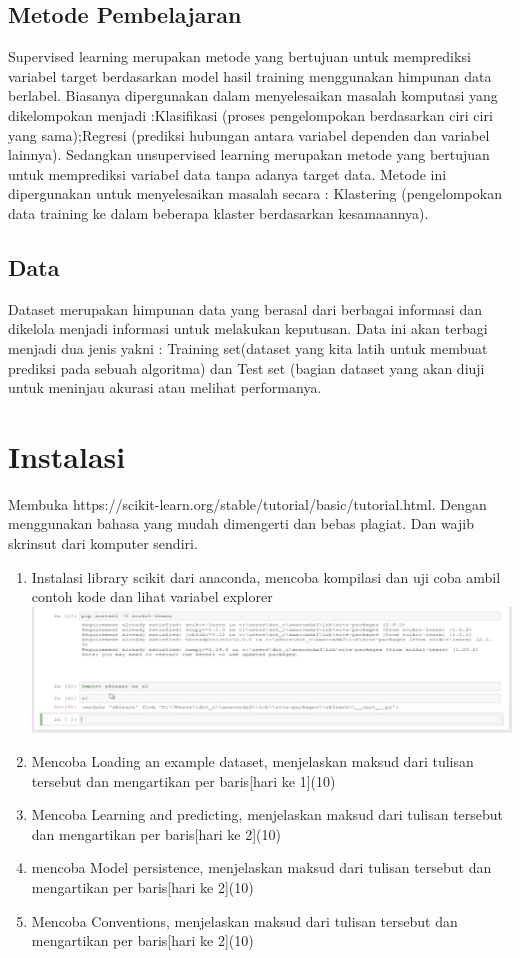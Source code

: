 \subsection{Metode Pembelajaran}
	Supervised learning merupakan metode yang bertujuan untuk memprediksi variabel target berdasarkan model hasil training menggunakan himpunan data berlabel. Biasanya dipergunakan dalam menyelesaikan masalah komputasi yang dikelompokan menjadi :Klasifikasi (proses pengelompokan berdasarkan ciri ciri yang sama);Regresi (prediksi hubungan antara variabel dependen dan variabel lainnya). Sedangkan unsupervised learning merupakan metode yang bertujuan untuk memprediksi variabel data tanpa adanya target data. Metode ini dipergunakan untuk menyelesaikan masalah secara : Klastering (pengelompokan data training ke dalam beberapa klaster berdasarkan kesamaannya).
\subsection{Data}
Dataset merupakan himpunan data yang berasal dari berbagai informasi dan dikelola menjadi informasi  untuk melakukan keputusan. Data ini akan terbagi menjadi dua jenis yakni : Training set(dataset yang kita latih untuk membuat prediksi pada sebuah algoritma) dan Test set (bagian dataset yang akan diuji untuk meninjau akurasi atau melihat performanya.

\section{Instalasi}
Membuka https://scikit-learn.org/stable/tutorial/basic/tutorial.html. Dengan menggunakan bahasa yang mudah dimengerti dan bebas plagiat. 
Dan wajib skrinsut dari komputer sendiri.
\begin{enumerate}
\item
Instalasi library scikit dari anaconda, mencoba kompilasi dan uji coba ambil contoh kode dan lihat variabel explorer\\
\includegraphics{figures/kb_c1_g1.png}\\
\item
Mencoba Loading an example dataset, menjelaskan maksud dari tulisan tersebut dan mengartikan per baris[hari ke 1](10)
\item
Mencoba Learning and predicting, menjelaskan maksud dari tulisan tersebut dan mengartikan per baris[hari ke 2](10)
\item
mencoba Model persistence, menjelaskan maksud dari tulisan tersebut dan mengartikan per baris[hari ke 2](10)
\item 
Mencoba Conventions, menjelaskan maksud dari tulisan tersebut dan mengartikan per baris[hari ke 2](10)
\end{enumerate}


